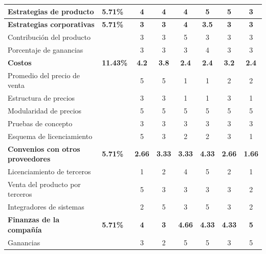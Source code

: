 \begin{table}[htbp]
\begin{center}
{\begin{tabular}{|p{5.5cm}|>{\centering\arraybackslash}m{1.7cm}|c|c|c|c|c|c|}
        \hline
        \rowcolor[gray]{0.9}\textbf{Estrategias de producto}
        & \textbf{5.71\%}
        & \textbf{4}
        & \textbf{4}
        & \textbf{4}
        & \textbf{5}
        & \textbf{5}
        & \textbf{3}\\
        \hline
        \rowcolor[gray]{0.9}\textbf{Estrategias corporativas}
        & \textbf{5.71\%}
        & \textbf{3}
        &\textbf{ 3}
        & \textbf{4}
        & \textbf{3.5}
        & \textbf{3}
        & \textbf{3}\\
        \hline
        Contribución del producto & & 3 & 3 & 5 & 3 & 3 & 3 \\
        \hline
        Porcentaje de ganancias & & 3 & 3 & 3 & 4 & 3 & 3 \\
        \hline
        \rowcolor[gray]{0.9}\textbf{Costos}
        & \textbf{11.43\%}
        & \textbf{4.2}
        & \textbf{3.8}
        & \textbf{2.4}
        & \textbf{2.4}
        & \textbf{3.2}
        & \textbf{2.4}\\
        \hline
        Promedio del precio de venta & & 5 & 5 & 1 & 1 & 2 & 2 \\
        \hline
        Estructura de precios & & 3 & 3 & 1 & 1 & 3 & 1 \\
        \hline
        Modularidad de precios & & 5 & 5 & 5 & 5 & 5 & 5 \\
        \hline
        Pruebas de concepto & & 3 & 3 & 3 & 3 & 3 & 3 \\
        \hline
        Esquema de licenciamiento & & 5 & 3 & 2 & 2 & 3 & 1 \\
        \hline
        \rowcolor[gray]{0.9}\textbf{Convenios con otros proveedores}
        & \textbf{5.71\%}
        & \textbf{2.66}
        & \textbf{3.33}
        & \textbf{3.33}
        & \textbf{4.33}
        & \textbf{2.66}
        & \textbf{1.66}\\
        \hline
        Licenciamiento de terceros & & 1 & 2 & 4 & 5 & 2 & 1 \\
        \hline
        Venta del producto por terceros & & 5 & 3 & 3 & 3 & 3 & 2 \\
        \hline
        Integradores de sistemas & & 2 & 5 & 3 & 5 & 3 & 2 \\
        \hline
        \rowcolor[gray]{0.9}\textbf{Finanzas de la compañía}
        & \textbf{5.71\%}
        & \textbf{4}
        & \textbf{3}
        & \textbf{4.66}
        & \textbf{4.33}
        & \textbf{4.33}
        & \textbf{5}\\
        \hline
        Ganancias & & 3 & 2 & 5 & 5 & 3 & 5 \\

\end{tabular}}
\end{center}
\end{table}
